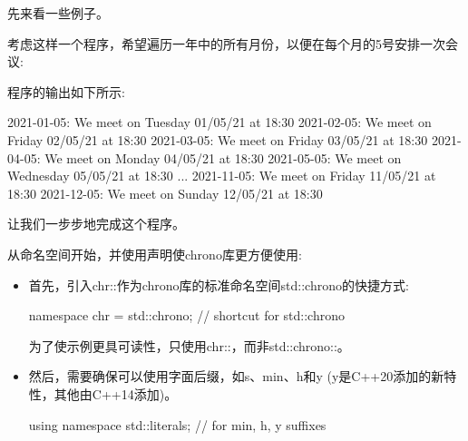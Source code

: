 
先来看一些例子。


考虑这样一个程序，希望遍历一年中的所有月份，以便在每个月的5号安排一次会议:



程序的输出如下所示:

\begin{shell}
2021-01-05:
 We meet on Tuesday 01/05/21 at 18:30
2021-02-05:
 We meet on Friday 02/05/21 at 18:30
2021-03-05:
 We meet on Friday 03/05/21 at 18:30
2021-04-05:
 We meet on Monday 04/05/21 at 18:30
2021-05-05:
 We meet on Wednesday 05/05/21 at 18:30
...
2021-11-05:
 We meet on Friday 11/05/21 at 18:30
2021-12-05:
 We meet on Sunday 12/05/21 at 18:30
\end{shell}

让我们一步步地完成这个程序。


从命名空间开始，并使用声明使chrono库更方便使用:

\begin{itemize}
\item
首先，引入chr::作为chrono库的标准命名空间std::chrono的快捷方式:

\begin{cpp}
namespace chr = std::chrono; // shortcut for std::chrono
\end{cpp}

为了使示例更具可读性，只使用chr::，而非std::chrono::。

\item
然后，需要确保可以使用字面后缀，如s、min、h和y (y是C++20添加的新特性，其他由C++14添加)。

\begin{cpp}
using namespace std::literals; // for min, h, y suffixes
\end{cpp}
\end{itemize}

